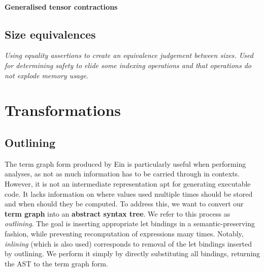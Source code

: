 
\paragraph{Generalised tensor contractions}

\todothis

\subsection{Size equivalences}

\textit{Using equality assertions to create an equivalence judgement between sizes. Used for determining safety to elide some indexing operations and that operations do not explode memory usage.} \todothis 


\section{Transformations}
\label{compiler-transformations}

\subsection{Outlining}

The term graph form produced by Ein is particularly useful when performing analyses, as not as much information has to be carried through in contexts. However, it is not an intermediate representation apt for generating executable code. It lacks information on where values used multiple times should be stored and when should they be computed. To address this, we want to convert our \textbf{term graph} into an \textbf{abstract syntax tree}. We refer to this process as \textit{outlining}. The goal is inserting appropriate let bindings in a semantic-preserving fashion, while preventing recomputation of expressions many times. Notably, \textit{inlining} (which is also used) corresponds to removal of the let bindings inserted by outlining. We perform it simply by directly substituting all bindings, returning the AST to the term graph form.

